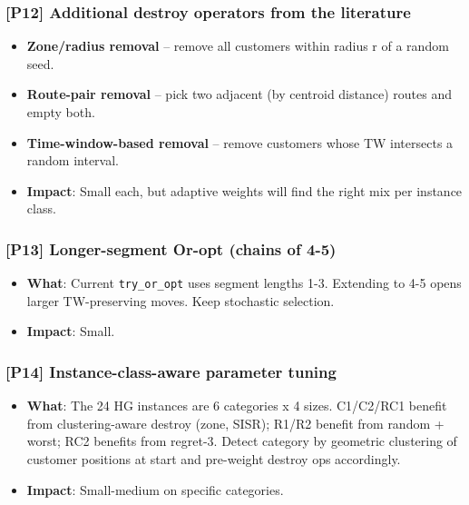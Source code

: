 \documentclass[twocolumn,10pt,letterpaper]{article}
\begin{document}
\subsubsection{[P12] Additional destroy operators from the literature}
\begin{itemize}
\setlength{\itemsep}{0pt}
\setlength{\parskip}{0pt}
  \item \textbf{Zone/radius removal} -- remove all customers within radius r of a random seed.
  \item \textbf{Route-pair removal} -- pick two adjacent (by centroid distance) routes and empty both.
  \item \textbf{Time-window-based removal} -- remove customers whose TW intersects a random interval.
  \item \textbf{Impact}: Small each, but adaptive weights will find the right mix per instance class.
\end{itemize}

\subsubsection{[P13] Longer-segment Or-opt (chains of 4-5)}
\begin{itemize}
\setlength{\itemsep}{0pt}
\setlength{\parskip}{0pt}
  \item \textbf{What}: Current \texttt{try\_or\_opt} uses segment lengths 1-3. Extending to 4-5 opens larger TW-preserving moves. Keep stochastic selection.
  \item \textbf{Impact}: Small.
\end{itemize}

\subsubsection{[P14] Instance-class-aware parameter tuning}
\begin{itemize}
\setlength{\itemsep}{0pt}
\setlength{\parskip}{0pt}
  \item \textbf{What}: The 24 HG instances are 6 categories x 4 sizes. C1/C2/RC1 benefit from clustering-aware destroy (zone, SISR); R1/R2 benefit from random + worst; RC2 benefits from regret-3. Detect category by geometric clustering of customer positions at start and pre-weight destroy ops accordingly.
  \item \textbf{Impact}: Small-medium on specific categories.
\end{itemize}
\end{document}
